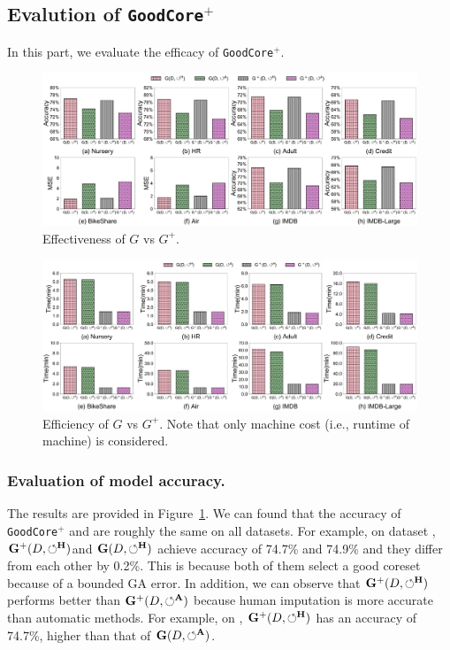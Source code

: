 \subsection{Evalution of \texttt{GoodCore}$^+$}
\label{exp:sec:G+}

In this part, we evaluate the efficacy of  \texttt{GoodCore}$^+$. 

\begin{figure}
	\centering
	\includegraphics[width=\textwidth]{figs/effectiveness_new}
	\caption{Effectiveness of $G$ vs $G^+$.}
	\label{fig:effectiveness_new}
\end{figure}

\begin{figure}
	\centering
	\includegraphics[width=\textwidth]{figs/efficiency_new}
	\caption{Efficiency of $G$ vs $G^+$. Note that only machine cost (i.e., runtime of machine) is considered.}
	\label{fig:efficiency_new}
\end{figure}

\subsubsection{Evaluation of model accuracy.}
The results are provided in Figure~\ref{fig:effectiveness_new}. We can found that the accuracy of \texttt{GoodCore}$^+$ and \ours are roughly the same on all datasets. For example, on dataset \imdbl,  $\mathbf{G}^+(D,\circlearrowleft^\mathbf{H})$and $\mathbf{G}(D,\circlearrowleft^\mathbf{H})$ achieve accuracy of 74.7\% and 74.9\% and they differ from each other by 0.2\%. This is because both of them   select a good coreset because of a bounded GA error. In addition, we can observe that $\mathbf{G}^+(D,\circlearrowleft^\mathbf{H})$ performs better than $\mathbf{G}^+(D,\circlearrowleft^\mathbf{A})$ because human imputation is more accurate than automatic methods. For example, on \imdbl,  $\mathbf{G}^+(D,\circlearrowleft^\mathbf{H})$ has an accuracy of 74.7\%, higher than that of $\mathbf{G}(D,\circlearrowleft^\mathbf{A})$.

